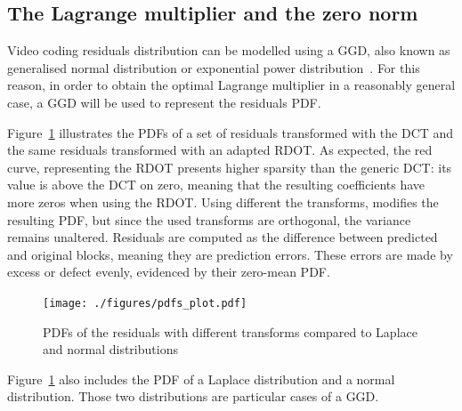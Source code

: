 \documentclass[11pt,a4paper,openright,twoside]{book}
\numberwithin{equation}{section} %
\numberwithin{figure}{section} %
\numberwithin{table}{section} %
\begin{document}
\subsection{The Lagrange multiplier and the zero norm}
\label{sub:the_lagrange_multiplier}

Video coding residuals distribution can be modelled using a \ac{GGD}, also
known as generalised normal distribution or exponential power
distribution~\cite{lam-00-dct-coefficient-distribution,
yovanof-96-analysis-dct-coefficients}.
For this reason, in order to obtain the optimal Lagrange multiplier in a
reasonably general case, a \ac{GGD} will be used to represent the
residuals \ac{PDF}.

Figure~\ref{fig:probability_density_functions} illustrates the \acp{PDF}
of a set of residuals transformed with the \ac{DCT} and the same residuals
transformed with an adapted \ac{RDOT}.
As expected, the red curve, representing the \ac{RDOT} presents higher
sparsity than the generic \ac{DCT}:
its value is above the \ac{DCT} on zero, meaning that the resulting
coefficients have more zeros when using the \ac{RDOT}.
Using different the transforms, modifies the resulting \ac{PDF}, but since the
used transforms are orthogonal, the variance remains unaltered.
Residuals are computed as the difference between predicted and original
blocks, meaning they are prediction errors.
These errors are made by excess or defect evenly, evidenced by their
zero-mean \ac{PDF}.
\begin{figure}[tb]
	\centering
	\texttt{[image: ./figures/pdfs\_plot.pdf]}
	\caption{\acsp{PDF} of the residuals with different transforms
	compared to Laplace and normal distributions}
	\label{fig:probability_density_functions}
\end{figure}
Figure~\ref{fig:probability_density_functions} also includes the
\ac{PDF} of a Laplace distribution and a normal distribution.
Those two distributions are particular cases of a \ac{GGD}.
\end{document}

